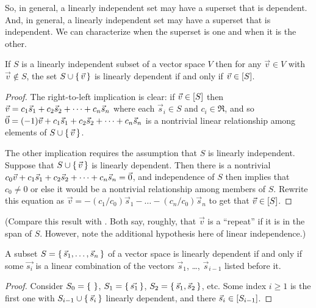 So, in general, a linearly independent set 
may have a superset that is dependent.
And, in general, a  
linearly independent set may  have a superset that is independent.
We can characterize when the superset is one and when it is the other.

\begin{lemma} \label{le:SUnionXiLIIffXiNotInSpan}
If \( S \) is a linearly independent subset of a vector space \( V \) then
for any \( \vec{v}\in V \) with \( \vec{v}\not\in S \), the set
$S\cup\mbox{$\{\,\vec{v}\,\}$}$ is linearly dependent
if and only if
$\vec{v}\in\relax [S\relax ]$.
\end{lemma}

\begin{proof}
The right-to-left implication is clear: if \( \vec{v}\in\relax [S\relax ] \) then
\( \vec{v}=c_1\vec{s}_1+c_2\vec{s}_2+\cdots +c_n\vec{s}_n \) where each \( \vec{s}_i\in S \) and
\( c_i\in\Re \), and so \( \vec{0}=(-1)\vec{v}+c_1\vec{s}_1+c_2\vec{s}_2+\cdots +c_n\vec{s}_n \)
is a nontrivial linear relationship among elements of
\( S\cup\mbox{$\{\,\vec{v}\,\}$} \).

The other implication requires the assumption that \( S \) is linearly
independent.
Suppose that
\( S\cup\mbox{$\{\,\vec{v}\,\}$} \) is linearly dependent.
Then there is a
nontrivial \( c_0\vec{v}+c_1\vec{s}_1+c_2\vec{s}_2+\cdots +c_n\vec{s}_n=\vec{0} \),
and independence of $S$ then implies that \( c_0\neq 0 \) 
or else it would be a nontrivial relationship among members of \( S \).
Rewrite this equation as
\( \vec{v}=-(c_1/c_0)\vec{s}_1-\dots-(c_n/c_0)\vec{s}_n \) to get
that \( \vec{v}\in\relax [S\relax ] \).
\end{proof}

\noindent
(Compare this result with .
Both say, roughly, that $\vec{v}$ is a ``repeat'' if it is in the
span of $S$.
However, note the additional hypothesis here of linear independence.)

\begin{corollary}
\label{cor:LDMeansLC}
A subset \( S=\mbox{$\{\,\vec{s}_1,\dots,\vec{s}_n\,\}$} \) of a vector space
is linearly dependent if and only if some \( \vec{s_i} \)
is a linear combination of the vectors 
\( \vec{s}_1 \), \ldots, \( \vec{s}_{i-1} \)
listed before it.
\end{corollary}

\begin{proof}
Consider \( S_0=\mbox{$\{\,\,\}$} \), \( S_1=\mbox{$\{\,\vec{s_1}\,\}$} \),
\( S_2=\mbox{$\{\,\vec{s}_1,\vec{s}_2 \,\}$} \), etc.
Some index \( i\geq 1 \) is the first one with
\( S_{i-1}\cup\mbox{$\{\,\vec{s}_i \,\}$} \)
linearly dependent, and there \( \vec{s}_i\in\relax [ S_{i-1} \relax ] \).
\end{proof}

